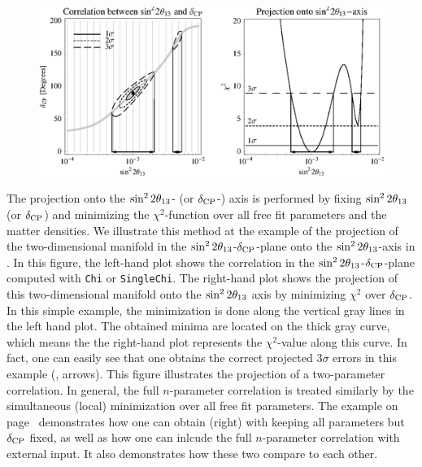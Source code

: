 \begin{figure}[t]
\begin{center}
\includegraphics[width=16cm]{projex}
\end{center}
\end{figure}

The projection onto the $\sin^2 2 \theta_{13}$- (or $\delta_{\mathrm{CP}}$-) axis is performed by fixing $\sin^2 2 \theta_{13}$ (or $\delta_{\mathrm{CP}}$) and minimizing the $\chi^2$-function over all free fit parameters and the matter densities. We illustrate this method at the example of the projection of the two-dimensional manifold in the $\sin^2 2 \theta_{13}$-$\delta_{\mathrm{CP}}$-plane onto the $\sin^2 2 \theta_{13}$-axis in . In this figure, the left-hand plot shows the correlation in the $\sin^2 2 \theta_{13}$-$\delta_{\mathrm{CP}}$-plane computed with {\tt Chi} or {\tt SingleChi}. The right-hand plot shows the projection of this two-dimensional manifold onto the $\sin^2 2 \theta_{13}$ axis by minimizing $\chi^2$ over $\delta_{\mathrm{CP}}$. In this simple example, the minimization is done along the vertical gray lines in the left hand plot. The obtained minima are located on the thick gray curve, which means the the right-hand plot represents the $\chi^2$-value along this curve. In fact, one can easily see that one obtains the correct projected $3 \sigma$ errors in this example (\cf, arrows). This figure illustrates the projection of a two-parameter correlation. In general, the full $n$-parameter correlation is treated similarly by the simultaneous (local) minimization over all free fit parameters. The example on page~\pageref{ex:corrproj} demonstrates how one can obtain  (right) with keeping all parameters but $\delta_{\mathrm{CP}}$ fixed, as well as how one can inlcude the full $n$-parameter correlation with external input. It also demonstrates how these two compare to each other.


